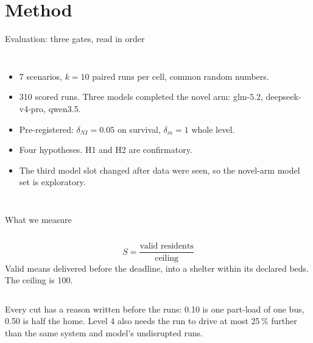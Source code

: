 \documentclass[10pt,aspectratio=169]{beamer}
\newcommand{\thesisfigmax}{0.82\textheight}
\newcommand{\thesisfig}[2][0.82\textheight]{%
  \begingroup
  \renewcommand{\thesisfigmax}{#1}%
  \renewenvironment{figure}[1][]%
    {\begin{lrbox}{\thesisfigbox}\ignorespaces}%
    {\unskip\end{lrbox}%
     {\centering\adjustbox{max width=\linewidth,max totalheight=\thesisfigmax}%
       {\usebox{\thesisfigbox}}\par}}%
  \renewcommand{\caption}[2][]{\ignorespaces}%
  \renewcommand{\label}[1]{\ignorespaces}%
  \endgroup}
\begin{document}
\section{Method}

\begin{frame}{Evaluation: three gates, read in order}
  \begin{columns}[c,onlytextwidth]
      \thesisfig[0.86\textheight]{../pics/method-gates}
      \small
      \begin{itemize}
        \item 7 scenarios, $k = 10$ paired runs per cell, common random
          numbers.
        \item 310 scored runs. Three models completed the novel arm:
          glm-5.2, deepseek-v4-pro, qwen3.5.
        \item Pre-registered: $\delta_{NI} = 0.05$ on survival,
          $\delta_m = 1$ whole level.
        \item Four hypotheses. H1 and H2 are confirmatory.
        \item The third model slot changed after data were seen, so the
          novel-arm model set is exploratory.
      \end{itemize}
  \end{columns}
\end{frame}

\begin{frame}{What we measure}
  \begin{columns}[c,onlytextwidth]
      \[
        S = \frac{\text{valid residents}}{\text{ceiling}}
      \]
      Valid means delivered before the deadline, into a shelter within its
      declared beds. The ceiling is 100.
  \end{columns}
  \bigskip
  \thesisfig[0.45\textheight]{figs/method-ladder}
  \medskip
  Every cut has a reason written before the runs: 0.10 is one part-load of
  one bus, 0.50 is half the home. Level 4 also needs the run to drive at
  most 25\,\% further than the same system and model's undisrupted runs.
\end{frame}
\end{document}
